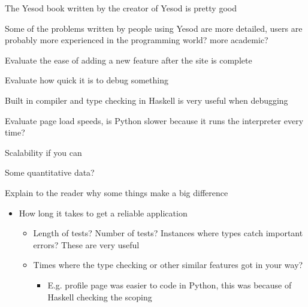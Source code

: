 The Yesod book written by the creator of Yesod is pretty good

Some of the problems written by people using Yesod are more detailed, users are probably more experienced in the programming world? more academic?

Evaluate the ease of adding a new feature after the site is complete

Evaluate how quick it is to debug something

Built in compiler and type checking in Haskell is very useful when debugging

Evaluate page load speeds, is Python slower because it runs the interpreter every time?

Scalability if you can

Some quantitative data?

Explain to the reader why some things make a big difference
\begin{itemize}
    \item{How long it takes to get a reliable application}
    \begin{itemize}
        \item{Length of tests? Number of tests? Instances where types catch important errors? These are very useful}
        \item{Times where the type checking or other similar features got in your way?}
        \begin{itemize}
            \item{E.g. profile page was easier to code in Python, this was because of Haskell checking the scoping}
		\end{itemize}
	\end{itemize}
\end{itemize}